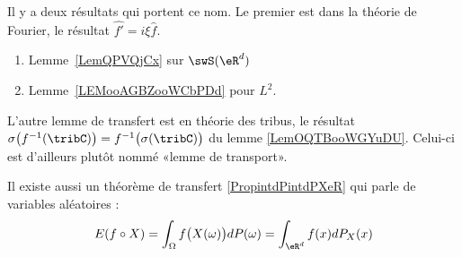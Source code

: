 
      \label{THEMEooJREIooKEdMOl}

Il y a deux résultats qui portent ce nom. Le premier est dans la théorie de Fourier, le résultat \( \hat{f'}=i\xi \hat{f}\).
\begin{enumerate}
	\item
	      Lemme~\ref{LemQPVQjCx} sur \( \swS(\eR^d)\)
	\item
	      Lemme~\ref{LEMooAGBZooWCbPDd} pour \( L^2\).
\end{enumerate}

L'autre lemme de transfert est en théorie des tribus, le résultat \( \sigma\big( f^{-1}(\tribC) \big)=f^{-1}\big( \sigma(\tribC) \big)\) du lemme \ref{LemOQTBooWGYuDU}. Celui-ci est d'ailleurs plutôt nommé «lemme de transport».

Il existe aussi un théorème de transfert \ref{PropintdPintdPXeR} qui parle de variables aléatoires :
	\begin{equation}
		E(f\circ X)=\int_{\Omega}f\big( X(\omega) \big)dP(\omega)=\int_{\eR^d}f(x)dP_X(x)
	\end{equation}

